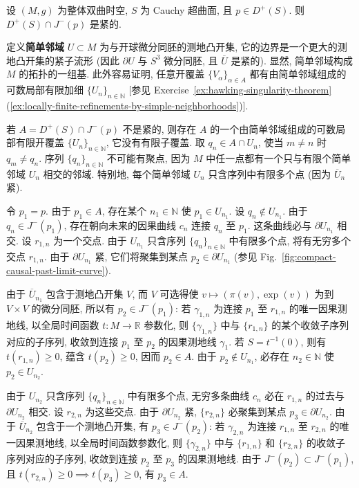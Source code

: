 \begin{RiemannProposition}\label{prop:compact-past-intersect-future-domain-of-dependence}
设 $(M,g)$ 为整体双曲时空, $S$ 为 Cauchy 超曲面, 且 $p\in D^+(S)$. 则 $D^+(S)\cap J^-(p)$ 是紧的.
\end{RiemannProposition}

\begin{RiemannProof}
定义\textbf{简单邻域} $U\subset M$ 为与开球微分同胚的测地凸开集, 它的边界是一个更大的测地凸开集的紧子流形 (因此 $\partial U$ 与 $S^3$ 微分同胚, 且 $\overline U$ 是紧的). 显然, 简单邻域构成 $M$ 的拓扑的一组基. 此外容易证明, 任意开覆盖 $\{V_\alpha\}_{\alpha\in A}$ 都有由简单邻域组成的可数局部有限加细 $\{U_n\}_{n\in\mathbb{N}}$ [参见 Exercise~\ref{ex:hawking-singularity-theorem}(\ref{ex:locally-finite-refinements-by-simple-neighborhoods})].

若 $A=D^+(S)\cap J^-(p)$ 不是紧的, 则存在 $A$ 的一个由简单邻域组成的可数局部有限开覆盖 $\{U_n\}_{n\in\mathbb{N}}$, 它没有有限子覆盖. 取 $q_n\in A\cap U_n$, 使当 $m\ne n$ 时 $q_m\ne q_n$. 序列 $\{q_n\}_{n\in\mathbb{N}}$ 不可能有聚点, 因为 $M$ 中任一点都有一个只与有限个简单邻域 $U_n$ 相交的邻域. 特别地, 每个简单邻域 $U_n$ 只含序列中有限多个点 (因为 $\overline U_n$ 紧).

令 $p_1=p$. 由于 $p_1\in A$, 存在某个 $n_1\in\mathbb{N}$ 使 $p_1\in U_{n_1}$. 设 $q_n\notin U_{n_1}$. 由于 $q_n\in J^-(p_1)$, 存在朝向未来的因果曲线 $c_n$ 连接 $q_n$ 至 $p_1$. 这条曲线必与 $\partial U_{n_1}$ 相交. 设 $r_{1,n}$ 为一个交点. 由于 $U_{n_1}$ 只含序列 $\{q_n\}_{n\in\mathbb{N}}$ 中有限多个点, 将有无穷多个交点 $r_{1,n}$. 由于 $\partial U_{n_1}$ 紧, 它们将聚集到某点 $p_2\in\partial U_{n_1}$ (参见 Fig.~\ref{fig:compact-causal-past-limit-curve}).

由于 $\overline U_{n_1}$ 包含于测地凸开集 $V$, 而 $V$ 可选得使 $v\mapsto(\pi(v),\exp(v))$ 为到 $V\times V$ 的微分同胚, 所以有 $p_2\in J^-(p_1)$: 若 $\gamma_{1,n}$ 为连接 $p_1$ 至 $r_{1,n}$ 的唯一因果测地线, 以全局时间函数 $t:M\to\mathbb{R}$ 参数化, 则 $\{\gamma_{1,n}\}$ 中与 $\{r_{1,n}\}$ 的某个收敛子序列对应的子序列, 收敛到连接 $p_1$ 至 $p_2$ 的因果测地线 $\gamma_1$. 若 $S=t^{-1}(0)$, 则有 $t(r_{1,n})\geq0$, 蕴含 $t(p_2)\geq0$, 因而 $p_2\in A$. 由于 $p_2\notin U_{n_1}$, 必存在 $n_2\in\mathbb{N}$ 使 $p_2\in U_{n_2}$.

由于 $U_{n_2}$ 只含序列 $\{q_n\}_{n\in\mathbb{N}}$ 中有限多个点, 无穷多条曲线 $c_n$ 必在 $r_{1,n}$ 的过去与 $\partial U_{n_2}$ 相交. 设 $r_{2,n}$ 为这些交点. 由于 $\partial U_{n_2}$ 紧, $\{r_{2,n}\}$ 必聚集到某点 $p_3\in\partial U_{n_2}$. 由于 $\overline U_{n_2}$ 包含于一个测地凸开集, 有 $p_3\in J^-(p_2)$: 若 $\gamma_{2,n}$ 为连接 $r_{1,n}$ 至 $r_{2,n}$ 的唯一因果测地线, 以全局时间函数参数化, 则 $\{\gamma_{2,n}\}$ 中与 $\{r_{1,n}\}$ 和 $\{r_{2,n}\}$ 的收敛子序列对应的子序列, 收敛到连接 $p_2$ 至 $p_3$ 的因果测地线. 由于 $J^-(p_2)\subset J^-(p_1)$, 且 $t(r_{2,n})\geq0\implies t(p_3)\geq0$, 有 $p_3\in A$.


\end{RiemannProof}
